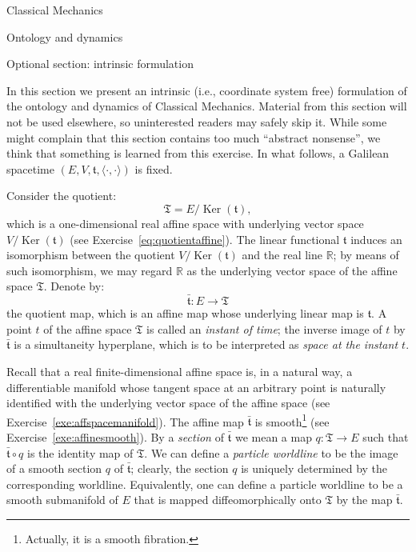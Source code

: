 \documentclass[oneside,a4paper,11pt]{amsbook}
\newcommand{\R}{\mathds R}
\DeclareMathOperator{\Ker}{Ker}
\theoremstyle{remark}\newtheorem{exercise}{Exercise}[chapter]
\theoremstyle{plain}\newtheorem{teo}{Theorem}[section]
\theoremstyle{plain}\newtheorem{lem}[teo]{Lemma}
\theoremstyle{plain}\newtheorem{prop}[teo]{Proposition}
\theoremstyle{plain}\newtheorem{cor}[teo]{Corollary}
\theoremstyle{definition}\newtheorem{defin}[teo]{Definition}
\theoremstyle{remark}\newtheorem{rem}[teo]{Remark}
\theoremstyle{definition}\newtheorem{notation}[teo]{Notation}
\theoremstyle{definition}\newtheorem{convention}[teo]{Convention}
\theoremstyle{definition}\newtheorem{example}[teo]{Example}
\numberwithin{section}{chapter}
\numberwithin{equation}{section}
\begin{document}
\begin{chapter}{Classical Mechanics}
\begin{section}{Ontology and dynamics}
\end{section}

\begin{section}{Optional section: intrinsic formulation}
\label{sec:intrinsicClMech}

In this section we present an intrinsic (i.e., coordinate system free) formulation of the ontology and
dynamics of Classical Mechanics. Material from this section will not be used elsewhere, so uninterested readers
may safely skip it. While some might complain that this section contains too much ``abstract nonsense'', we think
that something is learned from this exercise. In what follows, a Galilean spacetime
$(E,V,\mathfrak t,\langle\cdot,\cdot\rangle)$ is fixed.

Consider the quotient:
\[\mathfrak T=E/\Ker(\mathfrak t),\]
which is a one-dimensional real affine space with underlying vector space $V/\Ker(\mathfrak t)$ (see Exercise~\ref{eq:quotientaffine}).
The linear functional $\mathfrak t$ induces an isomorphism between the quotient $V/\Ker(\mathfrak t)$ and the real
line $\R$; by means of such isomorphism, we may regard $\R$ as the underlying vector space of the
affine space $\mathfrak T$. Denote by:
\[\bar{\mathfrak t}:E\longrightarrow\mathfrak T\]
the quotient map, which is an affine map whose underlying linear map is $\mathfrak t$. A point $t$ of the affine space
$\mathfrak T$ is called an {\em instant of time}; the inverse image of $t$ by $\bar{\mathfrak t}$ is a simultaneity
hyperplane, which is to be interpreted as {\em space at the instant $t$}.

Recall that a real finite-dimensional affine space is, in a natural way, a differentiable manifold whose tangent space
at an arbitrary point is naturally identified with the underlying vector space of the affine space
(see Exercise~\ref{exe:affspacemanifold}). The affine map $\bar{\mathfrak t}$ is smooth\footnote{%
Actually, it is a smooth fibration.} (see Exercise~\ref{exe:affinesmooth}).
By a {\em section\/} of $\bar{\mathfrak t}$ we mean a map $q:\mathfrak T\to E$ such that
$\bar{\mathfrak t}\circ q$ is the identity map of $\mathfrak T$. We can define a {\em particle worldline\/} to be
the image of a smooth section $q$ of $\bar{\mathfrak t}$; clearly, the section $q$ is uniquely determined by the
corresponding worldline. Equivalently, one can define a particle worldline to be a smooth submanifold of $E$
that is mapped diffeomorphically onto $\mathfrak T$ by the map $\bar{\mathfrak t}$.


\end{section}
\end{chapter}
\end{document}
